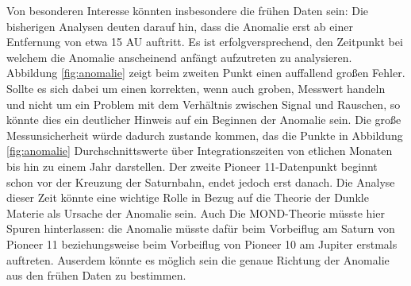 Von besonderen Interesse könnten insbesondere die frühen Daten sein:
Die bisherigen Analysen deuten darauf hin, dass die Anomalie erst ab einer Entfernung von etwa 15 AU auftritt. Es ist erfolgversprechend, den Zeitpunkt bei welchem die Anomalie anscheinend anfängt aufzutreten zu analysieren. Abbildung \ref{fig:anomalie} zeigt beim zweiten Punkt einen auffallend großen Fehler. Sollte es sich dabei um einen korrekten, wenn auch groben, Messwert handeln und nicht um ein Problem  mit dem Verhältnis zwischen Signal und Rauschen, so könnte dies ein deutlicher Hinweis auf ein Beginnen der Anomalie sein. %
Die große Messunsicherheit würde dadurch zustande kommen, das die Punkte in Abbildung \ref{fig:anomalie} Durchschnittswerte über Integrationszeiten von etlichen Monaten bis hin zu einem Jahr darstellen. Der zweite Pioneer 11-Datenpunkt beginnt schon vor der Kreuzung der Saturnbahn, endet jedoch erst danach.
Die Analyse dieser Zeit könnte eine wichtige Rolle in Bezug auf die Theorie der Dunkle Materie als Ursache der Anomalie sein. Auch Die MOND-Theorie müsste hier Spuren hinterlassen: die Anomalie müsste dafür beim Vorbeiflug am Saturn von Pioneer 11 beziehungsweise beim Vorbeiflug von Pioneer 10 am Jupiter erstmals auftreten\cite{Nieto2005}. %
Auserdem könnte es möglich sein die genaue Richtung der Anomalie aus den frühen Daten zu bestimmen.\cite{Nieto2004}


\FloatBarrier

